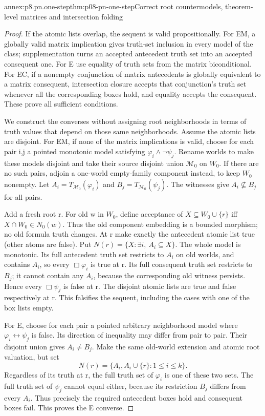 \begin{annexitem}{annex:p8.pn.one-step}{thm:p08-pn-one-step}{Correct root countermodels, theorem-level matrices and intersection folding}
\begin{proof}
If the atomic lists overlap, the sequent is valid propositionally.
For EM, a globally valid matrix implication gives truth-set
inclusion in every model of the class; supplementation turns an
accepted antecedent truth set into an accepted consequent one.
For E use equality of truth sets from the matrix biconditional.
For EC, if a nonempty conjunction of matrix antecedents is
globally equivalent to a matrix consequent, intersection closure
accepts that conjunction's truth set whenever all the corresponding
boxes hold, and equality accepts the consequent. These prove
all sufficient conditions.

We construct the converses without assigning root neighborhoods
in terms of truth values that depend on those same neighborhoods.
Assume the atomic lists are disjoint. For EM, if none of the
matrix implications is valid, choose for each pair i,j a pointed
monotonic model satisfying \(\varphi_i\land\neg\psi_j\).
Rename worlds to make these models disjoint and take their source
disjoint union \(\mathcal M_0\) on \(W_0\).
If there are no such pairs, adjoin a one-world empty-family
component instead, to keep \(W_0\) nonempty. Let
\(A_i=T_{\mathcal M_0}(\varphi_i)\) and
\(B_j=T_{\mathcal M_0}(\psi_j)\). The witnesses give
\(A_i\not\subseteq B_j\) for all pairs.

Add a fresh root r. For old w in \(W_0\), define acceptance
of \(X\subseteq W_0\cup\{r\}\) iff
\(X\cap W_0\in N_0(w)\). Thus the old component embedding
is a bounded morphism; no old formula truth changes. At r make
exactly the antecedent atomic list true (other atoms are false).
Put \(N(r)=\{X:\exists i,\ A_i\subseteq X\}\).
The whole model is monotonic. Its full antecedent truth set
restricts to \(A_i\) on old worlds, and contains \(A_i\),
so every \(\Box\varphi_i\) is true at r. Its full consequent
truth set restricts to \(B_j\); it cannot contain any
\(A_i\), because the corresponding old witness persists.
Hence every \(\Box\psi_j\) is false at r. The disjoint
atomic lists are true and false respectively at r. This falsifies
the sequent, including the cases with one of the box lists empty.

For E, choose for each pair a pointed arbitrary neighborhood model
where \(\varphi_i\leftrightarrow\psi_j\) is false. Its
direction of inequality may differ from pair to pair. Their disjoint
union gives \(A_i\ne B_j\). Make the same old-world extension
and atomic root valuation, but set
\[
 N(r)=\{A_i,A_i\cup\{r\}:1\leq i\leq k\}.
\]
Regardless of its truth at r, the full truth set of \(\varphi_i\)
is one of these two sets. The full truth set of \(\psi_j\)
cannot equal either, because its restriction \(B_j\) differs
from every \(A_i\). Thus precisely the required antecedent
boxes hold and consequent boxes fail. This proves the E converse.


\end{proof}
\end{annexitem}
